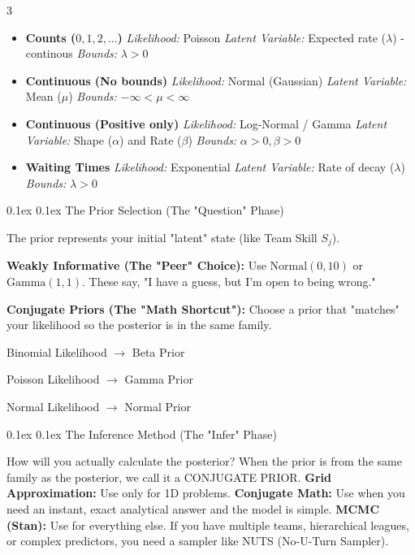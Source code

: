 \documentclass[8pt,landscape]{article}
\makeatletter
\renewcommand{\subsection}{\@startsection{subsection}{2}{0pt}%
    {0.1ex}%
    {0.1ex}%
    {\fontsize{8}{9}\bfseries\color{blue}}} %
\newcommand{\smalltext}[1]{
  {\fontsize{8}{9}\selectfont\sloppy #1\par}
}
\makeatother
\begin{document}
\begin{multicols}{3}
\begin{itemize}
  \item \textbf{Counts ($0, 1, 2, \dots$)} 
  \textit{Likelihood:} Poisson
  \textit{Latent Variable:} Expected rate ($\lambda$) - continous
  \textit{Bounds:} $\lambda > 0$
  
  \item \textbf{Continuous (No bounds)} 
  \textit{Likelihood:} Normal (Gaussian)
  \textit{Latent Variable:} Mean ($\mu$)
  \textit{Bounds:} $-\infty < \mu < \infty$
  
  \item \textbf{Continuous (Positive only)} 
  \textit{Likelihood:} Log-Normal / Gamma
  \textit{Latent Variable:} Shape ($\alpha$) and Rate ($\beta$)
  \textit{Bounds:} $\alpha > 0, \beta > 0$
  
  \item \textbf{Waiting Times} 
  \textit{Likelihood:} Exponential
  \textit{Latent Variable:} Rate of decay ($\lambda$)
  \textit{Bounds:} $\lambda > 0$
\end{itemize}

\subsection{The Prior Selection (The "Question" Phase)}
\smalltext{
  The prior represents your initial "latent" state (like Team Skill $S_j$).
  
  \textbf{Weakly Informative (The "Peer" Choice): }Use $\text{Normal}(0, 10)$ or $\text{Gamma}(1, 1)$. These say, "I have a guess, but I'm open to being wrong."
  
  \textbf{Conjugate Priors (The "Math Shortcut"):} Choose a prior that "matches" your likelihood so the posterior is in the same family.
  
  Binomial Likelihood $\rightarrow$ Beta Prior
  
  Poisson Likelihood $\rightarrow$ Gamma Prior
  
  Normal Likelihood $\rightarrow$ Normal Prior
}

\subsection{The Inference Method (The "Infer" Phase)}
\smalltext{
  How will you actually calculate the posterior?
  When the prior is from the same family as the posterior, we call it a CONJUGATE PRIOR.
  \textbf{Grid Approximation:} Use only for 1D problems.
  \textbf{Conjugate Math:} Use when you need an instant, exact analytical answer and the model is simple.
  \textbf{MCMC (Stan):} Use for everything else. If you have multiple teams, hierarchical leagues, or complex predictors, you need a sampler like NUTS (No-U-Turn Sampler).
}


\end{multicols}
\end{document}
